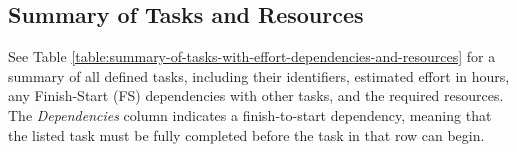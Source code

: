     \subsection{Summary of Tasks and Resources}

    See Table \ref{table:summary-of-tasks-with-effort-dependencies-and-resources} for a summary of all defined tasks, including their identifiers, estimated effort in hours, any Finish-Start (FS) dependencies with other tasks, and the required resources. The \textit{Dependencies} column indicates a finish-to-start dependency, meaning that the listed task must be fully completed before the task in that row can begin.

    \vspace{10pt}
    \pagestyle{fancy}
    \scriptsize
    \setlength{\tabcolsep}{2pt}
    \setlength{\arrayrulewidth}{0.1pt}
    \renewcommand{\arraystretch}{1.15}
    \setlength{\LTpre}{0pt}
    \setlength{\LTpost}{0pt}
    \setlength{\LTleft}{-0.2cm} 
    \setlength{\LTright}{0cm}

